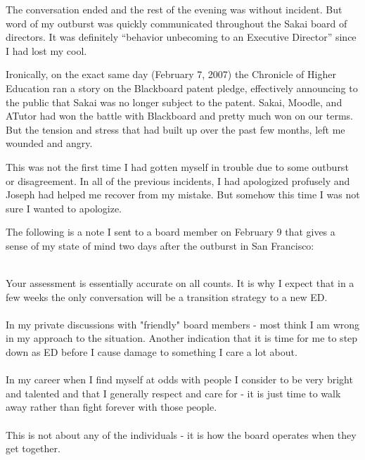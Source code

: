 \documentclass[12pt]{book}
\begin{document}
The conversation ended and the rest of the evening was without incident.   But
word of my outburst was quickly communicated throughout the Sakai board of
directors.  It was definitely ``behavior unbecoming to an Executive Director''
since I had lost my cool.

Ironically, on the exact same day (February 7, 2007) the Chronicle of Higher
Education ran a story on the Blackboard patent pledge, effectively announcing
to the public that Sakai was no longer subject to the patent.   Sakai, Moodle,
and ATutor had won the battle with Blackboard and pretty much won on our terms.
But the tension and stress that had built up over the past few months, left
me wounded and angry.

This was not the first time I had gotten myself in trouble due to some outburst
or disagreement.   In all of the previous incidents, I had apologized profusely
and Joseph had helped me recover from my mistake.  But somehow this time
I was not sure I wanted to apologize.

The following is a note I sent to a board member on February 9 that gives a sense
of my state of mind two days after the outburst in San Francisco:\\
\\
\begin{sf}
Your assessment is essentially accurate on all counts.   It is why
I expect that in a few weeks the only conversation will be a transition
strategy to a new ED.\\
\\
In my private discussions with "friendly" board members - most think
I am wrong in my approach to the situation.   Another indication that
it is time for me to step down as ED before I cause damage to something
I care a lot about.\\
\\
In my career when I find myself at odds with people I consider to be
very bright and talented and that I generally respect and care for -
it is just time to walk away rather than fight forever with those people.\\
\\
This is not about any of the individuals - it is how the board operates
when they get together.\\
\end{sf}

\end{document}

